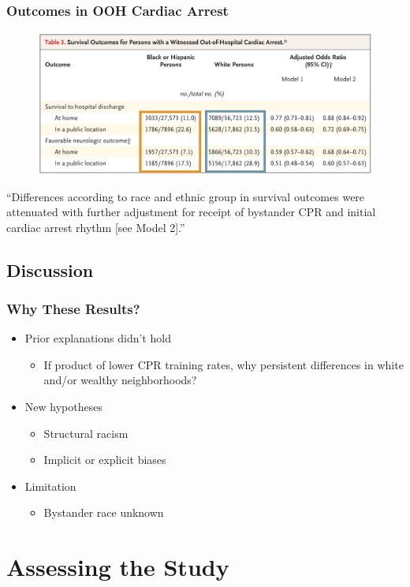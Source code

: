 \documentclass{beamer}
\begin{document}
		\begin{frame}
			\frametitle{Outcomes in OOH Cardiac Arrest}
			\pause
			\begin{figure}
				\centering
				\includegraphics[width=1.0\linewidth]{img/table3-boxed}
				\label{fig:tab3-boxed}
			\end{figure}
		\pause
		``Differences according to race and ethnic group in survival outcomes were attenuated with further adjustment for receipt of bystander CPR and initial cardiac arrest rhythm [see Model 2].''
		\end{frame}
	\subsection{Discussion}
		\begin{frame}
			\frametitle{Why These Results?}
				\begin{itemize}
					\item Prior explanations didn't hold
						\begin{itemize}
							\item If product of lower CPR training rates, why persistent differences in white and/or wealthy neighborhoods?
						\end{itemize}
					\item New hypotheses
						\begin{itemize}
							\item Structural racism
							\item Implicit or explicit biases
						\end{itemize}
					\item Limitation
						\begin{itemize}
							\item Bystander race unknown
						\end{itemize}
				\end{itemize}
		\end{frame}
\section{Assessing the Study}
\end{document}

